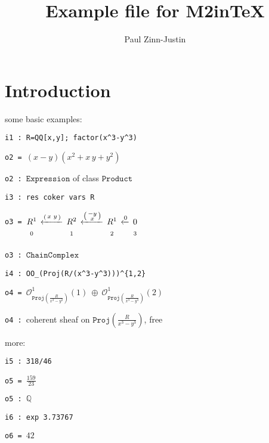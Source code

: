\documentclass[12pt,a4paper]{amsart}
\title{Example file for M2inTeX}
\author{Paul Zinn-Justin}
\begin{document}
\maketitle

\section{Introduction}
some basic examples:
\smallskip
\begin{verbatim}
i1 : R=QQ[x,y]; factor(x^3-y^3)
\end{verbatim}
\noindent\verb|o2 = |$\left(x-y\right)\left(x^{  2}+x\,y+y^{  2}\right)$

\noindent\verb|o2 : |$\texttt{Expression}$ of class $\texttt{Product}$
\begin{verbatim}
i3 : res coker vars R
\end{verbatim}
\noindent\verb|o3 = |$\underset{\vphantom{\Big|}0}{R^{  1}}\,\xleftarrow{\left(\begin{smallmatrix}
x&y\\
\end{smallmatrix}\right)}\,\underset{\vphantom{\Big|}1}{R^{  2}}\,\xleftarrow{\left(\begin{smallmatrix}
-y\\
x\\
\end{smallmatrix}\right)}\,\underset{\vphantom{\Big|}2}{R^{  1}}\,\xleftarrow{0}\,\underset{\vphantom{\Big|}3}{0}$

\noindent\verb|o3 : |$\texttt{ChainComplex}$
\begin{verbatim}
i4 : OO_(Proj(R/(x^3-y^3)))^{1,2}
\end{verbatim}
\noindent\verb|o4 = |${\mathcal O}_{\texttt{Proj}\left(\frac{R}{x^{  3}-y^{  3}}\right)}^{  1}\left(  1\right)\ \oplus \ {\mathcal O}_{\texttt{Proj}\left(\frac{R}{x^{  3}-y^{  3}}\right)}^{  1}\left(  2\right)$

\noindent\verb|o4 : |coherent sheaf on $\texttt{Proj}\left(\frac{R}{x^{  3}-y^{  3}}\right)$, free
\smallskip

more:
\smallskip
\begin{verbatim}
i5 : 318/46
\end{verbatim}
\noindent\verb|o5 = |$\frac{159}{ 23}$

\noindent\verb|o5 : |${\mathbb Q}$
\begin{verbatim}
i6 : exp 3.73767
\end{verbatim}
\noindent\verb|o6 = |${42}$
\end{document}
